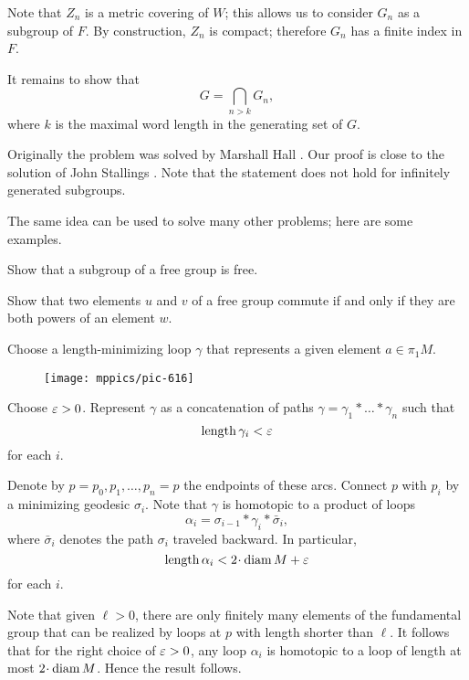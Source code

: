 Note that $Z_n$ is a metric covering of $W$;
this allows us to consider $G_n$ as a subgroup of $F$.
By construction, $Z_n$ is compact;
therefore $G_n$ has a finite index in $F$.


It remains to show that 
\[G=\bigcap_{n>k} G_n,\]
where $k$ is the maximal word length in the generating set of $G$.
\qeds

Originally the problem was solved by Marshall Hall \cite{hall1,hall2,burns}.
Our proof is close to the solution of John Stallings \cite{stallings,wilton}.
Note that the statement does not hold for infinitely generated subgroups. %

The same idea can be used to solve many other problems; here are some examples.

\begin{pr}
Show that a subgroup of a free group is free.
\end{pr}

\begin{pr}
 Show that two elements $u$ and $v$ of a free group commute 
if and only if they are both powers of
an element $w$.
\end{pr}




Choose a length-minimizing loop $\gamma$ that represents a given element $a\in\pi_1M$.

\begin{wrapfigure}{o}{21 mm}
\vskip0mm
\centering
\texttt{[image: mppics/pic-616]}
\vskip1mm
\end{wrapfigure}

Choose $\varepsilon>0$.
Represent $\gamma$ 
as a concatenation of paths
$\gamma=\gamma_1{*}\dots{*}\gamma_n$
such that
\[\operatorname{\rm length}\gamma_i<\varepsilon\] 
for each $i$.

 
Denote by $p=p_0,p_1,\dots, p_n=p$ the endpoints of these arcs.
Connect $p$ with $p_i$ by a minimizing geodesic $\sigma_i$.
Note that $\gamma$ is homotopic to a product of loops
\[\alpha_i=\sigma_{i-1}{*}\gamma_i{*}\bar\sigma_{i},\]
where $\bar\sigma_{i}$ denotes the path $\sigma_{i}$ traveled backward.
In particular,
\[\length \alpha_i<2\cdot\diam M+\eps \]
for each $i$.

Note that given $\ell>0$, there are only finitely many elements of the fundamental group that can be realized by loops at $p$ with length shorter than $\ell$.
It follows that for the right choice of $\varepsilon>0$, 
any loop $\alpha_i$ is homotopic to a loop of length at most $2\cdot\diam M$.
Hence the result follows.
\qeds

